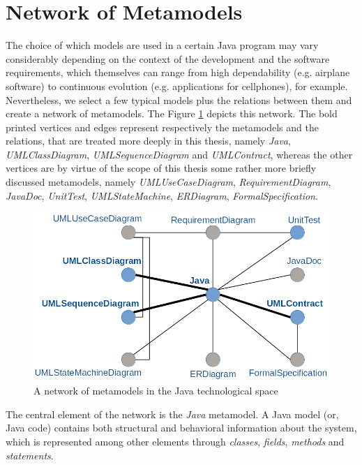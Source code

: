 \documentclass[tuberlin,cic,tc,english,noabntcite]{iiufrgs}
\begin{document}
\section{Network of Metamodels}
The choice of which models are used in a certain Java program may vary considerably depending on the context of the development and the software requirements, which themselves can range from high dependability (e.g. airplane software) to continuous evolution (e.g. applications for cellphones), for example. Nevertheless, we select a few typical models plus the relations between them and create a network of metamodels. The Figure \ref{fig:network_metamodels} depicts this network. The bold printed vertices and edges represent respectively the metamodels and the relations, that are treated more deeply in this thesis, namely \emph{Java}, \emph{UMLClassDiagram}, \emph{UMLSequenceDiagram} and \emph{UMLContract}, whereas the other vertices are by virtue of the scope of this thesis some rather more briefly discussed metamodels, namely \emph{UMLUseCaseDiagram}, \emph{RequirementDiagram}, \emph{JavaDoc}, \emph{UnitTest}, \emph{UMLStateMachine}, \emph{ERDiagram}, \emph{FormalSpecification}.

\begin{figure}[H]
    \caption{A network of metamodels in the Java technological space}
    \begin{center}
        \includegraphics[width=.6\textwidth]{network_metamodels}
    \end{center}
    \label{fig:network_metamodels}
\end{figure}

The central element of the network is the \emph{Java} metamodel. A Java model (or, Java code) contains both structural and behavioral information about the system, which is represented among other elements through \emph{classes}, \emph{fields}, \emph{methods} and \emph{statements}.
\end{document}
